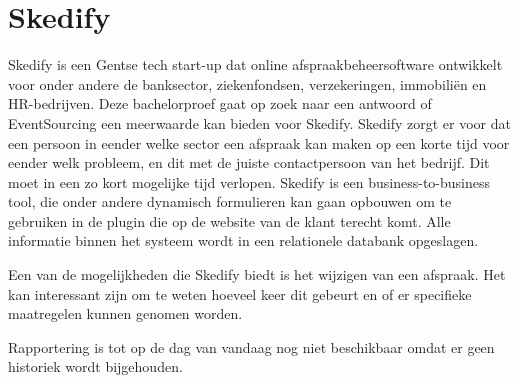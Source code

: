 
\chapter{Skedify}
\label{ch:skedify}

Skedify is een Gentse tech start-up dat online afspraakbeheersoftware ontwikkelt voor onder andere de banksector, ziekenfondsen, verzekeringen, immobiliën en HR-bedrijven. Deze bachelorproef gaat op zoek naar een antwoord of EventSourcing een meerwaarde kan bieden voor Skedify. Skedify zorgt er voor dat een persoon in eender welke sector een afspraak kan maken op een korte tijd voor eender welk probleem, en dit met de juiste contactpersoon van het bedrijf. Dit moet in een zo kort mogelijke tijd verlopen. Skedify is een business-to-business tool, die onder andere dynamisch formulieren kan gaan opbouwen om te gebruiken in de plugin die op de website van de klant terecht komt. Alle informatie binnen het systeem wordt in een relationele databank opgeslagen.

Een van de mogelijkheden die Skedify biedt is het wijzigen van een afspraak. Het kan interessant zijn om te weten hoeveel keer dit gebeurt en of er specifieke maatregelen kunnen genomen worden.

Rapportering is tot op de dag van vandaag nog niet beschikbaar omdat er geen historiek wordt bijgehouden.